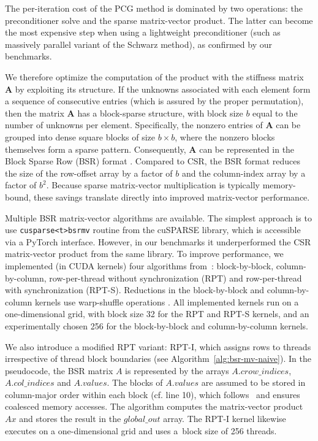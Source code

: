 \documentclass[11pt]{article}
\theoremstyle{definition}
\theoremstyle{theorem}
\begin{document}
The per-iteration cost of the PCG method is dominated by two operations:
the preconditioner solve and the sparse matrix-vector product. The latter can become
the most expensive step when using a lightweight preconditioner (such as massively
parallel variant of the Schwarz method), as confirmed by our benchmarks.

We therefore optimize the computation of the product with the stiffness matrix $\bm{A}$
by exploiting its structure. If the unknowns associated with each element
form a sequence of consecutive entries (which is assured by the proper permutation), then the
matrix $\bm{A}$ has a block-sparse structure, with block size $b$ equal to the number
of unknowns per element. Specifically, the nonzero entries of $\bm{A}$ can be grouped
into dense square blocks of size $b\times b$, where the nonzero blocks themselves form
a sparse pattern. Consequently, $\bm{A}$ can be represented in the Block Sparse Row (BSR)
format \cite[Section 3.3.6]{cusparse}. Compared to CSR, the BSR format reduces the size
of the row-offset array by a factor of $b$ and the column-index array by a factor of $b^2$.
Because sparse matrix-vector multiplication is typically memory-bound, these savings
translate directly into improved matrix-vector performance.

Multiple BSR matrix-vector algorithms are available.
The simplest approach is to use \texttt{cusparse<t>bsrmv} routine from the
cuSPARSE library, which is accessible via a PyTorch
interface. However, in our benchmarks it underperformed the CSR matrix-vector
product from the same library.
To improve performance, we implemented (in CUDA kernels)
four algorithms from~\cite{bsr-mv}: block-by-block,
column-by-column, row\nobreakdash-per\nobreakdash-thread without synchronization (RPT) and
row-per-thread with synchronization (RPT-S). Reductions in the block-by-block and
column\nobreakdash-by\nobreakdash-column kernels use warp-shuffle operations
\cite[Section 7.22]{cuda-guide}. All implemented kernels
run on a one-dimensional grid, with block size 32 for the RPT and RPT-S
kernels, and an experimentally chosen 256 for the block-by-block and column\nobreakdash-by\nobreakdash-column
kernels.

We also introduce a modified RPT variant: RPT-I, which assigns
rows to threads irrespective of thread block boundaries (see
Algorithm~\ref{alg:bsr-mv-naive}). In the pseudocode, the BSR matrix $A$ is
represented by the arrays $A.crow\_indices$, $A.col\_indices$ and $A.values$.
The blocks of $A.values$ are assumed to be stored in column-major order
within each block (cf. line 10), which follows~\cite{bsr-mv} and ensures
coalesced memory accesses. The algorithm computes the matrix-vector product
$Ax$ and stores the result in the $global\_out$ array. The RPT-I kernel likewise
executes on a one-dimensional grid and uses a~block size of 256 threads.
\end{document}
